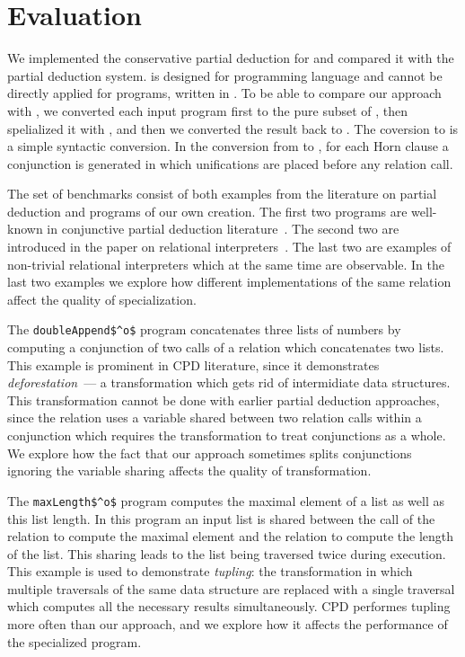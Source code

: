 \section{Evaluation}

We implemented the conservative partial deduction for \mk and compared it with the \ecce partial deduction system.
\ecce is designed for \pro programming language and cannot be directly applied for programs, written in \mk.
To be able to compare our approach with \ecce, we converted each input program first to the pure subset of \pro, then spelialized it with \ecce, and then we converted the result back to \mk.
The coversion to \pro is a simple syntactic conversion. In the conversion from \pro to \mk, for each Horn clause a conjunction is generated in which unifications are placed before any relation call.


The set of benchmarks consist of both examples from the literature on partial deduction and programs of our own creation.
The first two programs are well-known in conjunctive partial deduction literature~\cite{de1999conjunctive}.
The second two are introduced in the paper on relational interpreters~\cite{lozov2019relational}.
The last two are examples of non-trivial relational interpreters which at the same time are observable.
In the last two examples we explore how different implementations of the same relation affect the quality of specialization.

The \lstinline{doubleAppend$^o$} program concatenates three lists of numbers by computing a conjunction of two calls of a relation which concatenates two lists.
This example is prominent in CPD literature, since it demonstrates \emph{deforestation}~--- a transformation which gets rid of intermidiate data structures.
This transformation cannot be done with earlier partial deduction approaches, since the relation uses a variable shared between two relation calls within a
conjunction which requires the transformation to treat conjunctions as a whole.
We explore how the fact that our approach sometimes splits conjunctions ignoring the variable sharing affects the quality of transformation.

The \lstinline{maxLength$^o$} program computes the maximal element of a list as well as this list length.
In this program an input list is shared between the call of the relation to compute the maximal element and the relation to compute the length of the list.
This sharing leads to the list being traversed twice during execution.
This example is used to demonstrate \emph{tupling}: the transformation in which multiple traversals of the same data structure are replaced with a single traversal which
computes all the necessary results simultaneously. CPD performes tupling more often than our approach, and we explore how it affects the performance of the specialized program.

